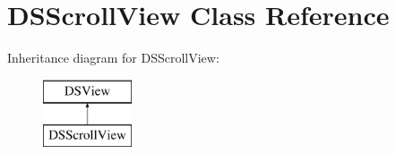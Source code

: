 \hypertarget{class_d_s_scroll_view}{\section{D\+S\+Scroll\+View Class Reference}
\label{class_d_s_scroll_view}
}
Inheritance diagram for D\+S\+Scroll\+View\+:\begin{figure}[H]
\begin{center}
\leavevmode
\includegraphics[height=2.000000cm]{class_d_s_scroll_view}
\end{center}
\end{figure}
